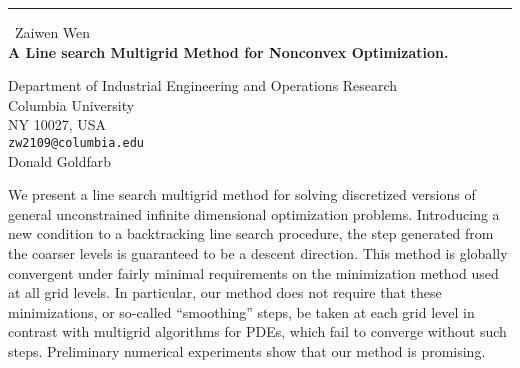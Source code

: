 \documentclass{report}
\begin{document}
\begin{center}
\rule{6in}{1pt} \
{\large Zaiwen Wen \\
{\bf A Line search Multigrid Method for Nonconvex Optimization.
}}

Department of Industrial Engineering and Operations Research \\ 
Columbia University \\
NY 10027, USA \\
{\tt zw2109@columbia.edu}\\
Donald Goldfarb
\end{center}

We present a  line search multigrid method for solving discretized versions of
general unconstrained infinite dimensional optimization problems. Introducing a
new condition to a backtracking line search procedure, the step generated from
the coarser levels is guaranteed to be a descent direction. This method is
globally convergent under fairly minimal requirements on the
minimization method used at all grid levels. In particular, our
method does not require that these minimizations, or
so-called ``smoothing'' steps,  be taken at each grid level in
contrast with multigrid
algorithms for PDEs, which fail to converge without such steps.
Preliminary numerical experiments show that our method is promising.
\end{document}
